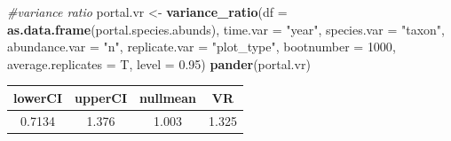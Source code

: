 \documentclass[]{article}
\newenvironment{Shaded}{\begin{snugshade}}{\end{snugshade}}
\newcommand{\KeywordTok}[1]{\textcolor[rgb]{0.13,0.29,0.53}{\textbf{{#1}}}}
\newcommand{\DataTypeTok}[1]{\textcolor[rgb]{0.13,0.29,0.53}{{#1}}}
\newcommand{\DecValTok}[1]{\textcolor[rgb]{0.00,0.00,0.81}{{#1}}}
\newcommand{\FloatTok}[1]{\textcolor[rgb]{0.00,0.00,0.81}{{#1}}}
\newcommand{\StringTok}[1]{\textcolor[rgb]{0.31,0.60,0.02}{{#1}}}
\newcommand{\CommentTok}[1]{\textcolor[rgb]{0.56,0.35,0.01}{\textit{{#1}}}}
\newcommand{\NormalTok}[1]{{#1}}
\begin{document}
\begin{Shaded}
\begin{Highlighting}[]
\CommentTok{#variance ratio}
\NormalTok{portal.vr <-}\StringTok{ }\KeywordTok{variance_ratio}\NormalTok{(}\DataTypeTok{df =} \KeywordTok{as.data.frame}\NormalTok{(portal.species.abunds),}
                            \DataTypeTok{time.var =} \StringTok{"year"}\NormalTok{, }\DataTypeTok{species.var =} \StringTok{"taxon"}\NormalTok{,}
                            \DataTypeTok{abundance.var =} \StringTok{"n"}\NormalTok{, }\DataTypeTok{replicate.var =} \StringTok{"plot_type"}\NormalTok{,}
                            \DataTypeTok{bootnumber =} \DecValTok{1000}\NormalTok{, }\DataTypeTok{average.replicates =} \NormalTok{T,}
                            \DataTypeTok{level =} \FloatTok{0.95}\NormalTok{)}
\KeywordTok{pander}\NormalTok{(portal.vr)}
\end{Highlighting}
\end{Shaded}

\begin{longtable}[]{@{}cccc@{}}
\toprule
\begin{minipage}[b]{0.12\columnwidth}\centering\strut
lowerCI\strut
\end{minipage} & \begin{minipage}[b]{0.12\columnwidth}\centering\strut
upperCI\strut
\end{minipage} & \begin{minipage}[b]{0.14\columnwidth}\centering\strut
nullmean\strut
\end{minipage} & \begin{minipage}[b]{0.06\columnwidth}\centering\strut
VR\strut
\end{minipage}\tabularnewline
\midrule
\endhead
\begin{minipage}[t]{0.12\columnwidth}\centering\strut
0.7134\strut
\end{minipage} & \begin{minipage}[t]{0.12\columnwidth}\centering\strut
1.376\strut
\end{minipage} & \begin{minipage}[t]{0.14\columnwidth}\centering\strut
1.003\strut
\end{minipage} & \begin{minipage}[t]{0.06\columnwidth}\centering\strut
1.325\strut
\end{minipage}\tabularnewline
\bottomrule
\end{longtable}
\end{document}
